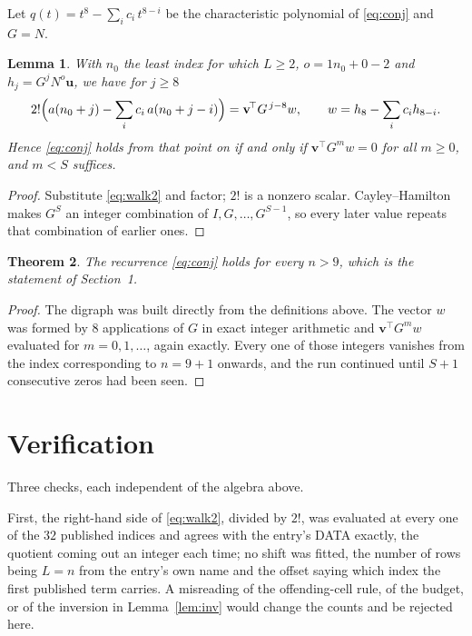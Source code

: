 \documentclass[11pt,a4paper]{article}
\theoremstyle{plain}
\newtheorem{theorem}{Theorem}
\newtheorem{lemma}[theorem]{Lemma}
\theoremstyle{definition}
\begin{document}
Let $q(t)=t^{8}-\sum_i c_i\,t^{8-i}$ be the characteristic polynomial of
\eqref{eq:conj} and $G=N$.

\begin{lemma}\label{lem:crit}
With $n_0$ the least index for which $L\ge2$, $o=1n_0+0-2$ and
$h_j=G^{j}N^{o}\mathbf{u}$, we have for $j\ge8$
\[
2!\Bigl(a(n_0+j)-\sum_i c_i\,a(n_0+j-i)\Bigr)=\mathbf{v}^{\!\top}G^{\,j-8}w,
\qquad w=h_{8}-\sum_i c_i h_{8-i} .
\]
Hence \eqref{eq:conj} holds from that point on if and only if
$\mathbf{v}^{\!\top}G^{m}w=0$ for all $m\ge0$, and $m<S$ suffices.
\end{lemma}

\begin{proof}
Substitute \eqref{eq:walk2} and factor; $2!$ is a nonzero scalar. Cayley--Hamilton
makes $G^{S}$ an integer combination of $I,G,\dots,G^{S-1}$, so every later value repeats
that combination of earlier ones.
\end{proof}

\begin{theorem}
The recurrence \eqref{eq:conj} holds for every $n>9$, which is the statement of
Section~1.
\end{theorem}

\begin{proof}
The digraph was built directly from the definitions above. The vector $w$ was formed by
$8$ applications of $G$ in exact integer arithmetic and $\mathbf{v}^{\!\top}G^{m}w$
evaluated for $m=0,1,\dots$, again exactly. Every one of those integers vanishes from the
index corresponding to $n=9+1$ onwards, and the run continued until $S+1$ consecutive
zeros had been seen.
\end{proof}

\section{Verification}

Three checks, each independent of the algebra above.

First, the right-hand side of \eqref{eq:walk2}, divided by $2!$, was evaluated at every
one of the $32$ published indices and agrees with the entry's DATA exactly, the quotient
coming out an integer each time; no shift was fitted, the number of rows being
$L=n$ from the entry's own name and the offset saying which index the first published
term carries. A misreading of the offending-cell rule, of the budget, or of the inversion in
Lemma~\ref{lem:inv} would change the counts and be rejected here.
\end{document}
